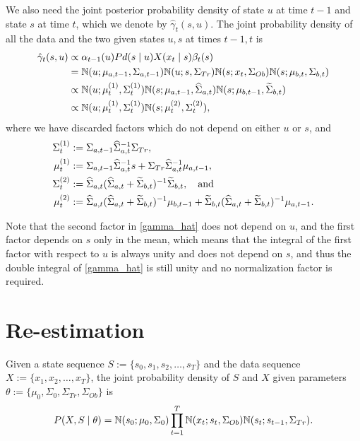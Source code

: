 \documentclass[12pt,leqno]{article}
\begin{document}
We also need the joint posterior probability density of state $u$ at time $t-1$ and state $s$ at time $t$,
which we denote by $\hat{\gamma}_t(s,u)$. The joint probability density of all the data and the two given states
  $u,s$  at times $t-1,t$ is
  \begin{align}
    \hat{\gamma}_t(s,u) &\propto \alpha_{t-1}(u)Pd(s\mid u)X(x_t\mid s)\beta_t(s) \notag\\
    &= {\mathbb N}(u;\mu_{a,t-1},\Sigma_{a,t-1}){\mathbb N}(u;s,\Sigma_{Tr})  {\mathbb N}(s;x_t,\Sigma_{Ob}){\mathbb N}(s;\mu_{b,t},\Sigma_{b,t})\notag\\
    &\propto {\mathbb N}(u;\mu^{(1)}_t,\Sigma^{(1)}_t){\mathbb N}(s;\mu_{a,t-1},\widehat{\Sigma}_{a,t}){\mathbb N}(s;\mu_{b,t-1},
    \widetilde{\Sigma}_{b,t})\notag\\
    &\propto {\mathbb N}(u;\mu^{(1)}_t,\Sigma^{(1)}_t){\mathbb N}(s;\mu^{(2)}_t,\Sigma^{(2)}_t),\label{gamma_hat}
  \end{align}
  where we have discarded factors which do not depend on either $u$ or $s$, and 
  \begin{align}
    \Sigma^{(1)}_t &:= \Sigma_{a,t-1}\widehat{\Sigma}_{a,t}^{-1}\Sigma_{Tr},\notag\\
    \mu^{(1)}_t &:= \Sigma_{a,t-1}\widehat{\Sigma}_{a,t}^{-1}s + \Sigma_{Tr}\widehat{\Sigma}_{a,t}^{-1}\mu_{a,t-1},\label{mu(1)}\\
    \Sigma^{(2)}_t &:= \widehat{\Sigma}_{a,t}(\widehat{\Sigma}_{a,t}+\widetilde{\Sigma}_{b,t})^{-1}\widetilde{\Sigma}_{b,t},\notag\quad\text{and}\\
    \mu^{(2)}_t &:= \widehat{\Sigma}_{a,t}(\widehat{\Sigma}_{a,t}+\widetilde{\Sigma}_{b,t})^{-1}\mu_{b,t-1} +
    \widetilde{\Sigma}_{b,t}(\widehat{\Sigma}_{a,t}+\widetilde{\Sigma}_{b,t})^{-1}\mu_{a,t-1}.
  \end{align}

  Note that the second factor in \eqref{gamma_hat} does not depend on $u$, and the first factor depends on $s$
  only in the mean, which means that the integral of the first factor with respect to $u$ is always unity
  and does not depend on $s$, and thus the double integral of \eqref{gamma_hat} is still unity and no
  normalization factor is required.
  
\section{Re-estimation}
Given a state sequence $S := \{s_0,s_1,s_2,\dots,s_T\}$ and the data sequence $X := \{x_1,x_2,\dots,x_T\}$, the
joint probability density of $S$ and $X$ given parameters $\theta := \{\mu_0,\Sigma_0,\Sigma_{Tr},\Sigma_{Ob}\}$ is
$$
P(X,S\mid\theta) = {\mathbb N}(s_0;\mu_0,\Sigma_0)\prod_{t=1}^T{\mathbb N}(x_t;s_t,\Sigma_{Ob}){\mathbb N}(s_t;s_{t-1},\Sigma_{Tr}).
$$
\end{document}
